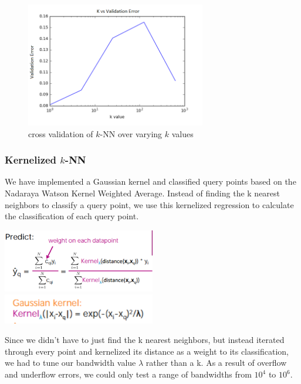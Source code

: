 \documentclass{article} %
\begin{document}
\begin{figure}[h]
\centering
\includegraphics[width=0.7\textwidth]{knn-c-cv.png}
\caption{cross validation of $k$-NN over varying $k$ values}
\label{fig:knn-c-cv}
\end{figure}

\subsubsection{Kernelized $k$-NN}
We have implemented a Gaussian kernel and classified query points
based on the Nadaraya Watson Kernel Weighted Average. Instead of finding
the k nearest neighbors to classify a query point, we use this kernelized
regression to calculate the classification of each query point.

\includegraphics[width=0.5\textwidth]{nadaraya-watson.png}
\includegraphics[width=0.5\textwidth]{gaussian-kernel.png}

Since we didn’t have to just find the k nearest neighbors, but instead
iterated through every point and kernelized its distance as a weight to
its classification, we had to tune our bandwidth value $\lambda$ rather than a k.
As a result of overflow and underflow errors, we could only test a range
of bandwidths from $10^4$ to $10^6$. 
\end{document}
